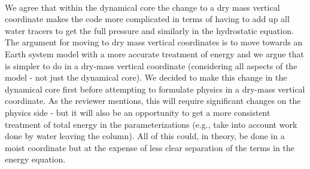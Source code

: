 \documentclass[11pt]{article}
\begin{document}
{\color{blue}{
While interesting from a design standpoint, I am not convinced that the change from moist-mass to a dry-mass vertical coordinate represents an improvement to the model, despite the great effort that would be required for this change, inside and outside of the core. The main justification given is that it makes a number of parts of the model ``easier'', although it is not clear that this is the case. While it may eliminate the need to rescale tracer masses, now the mass effect of water vapor and the condensates needs to be explicitly added in when computing the pressure-gradient force, among other considerations. It is also mentioned in Section 4.2 that many parts of the physics would need to be re-written to work with dry mass; most notably, the use of dry mass leads to the inequality of the hydrostatic assumption in (47), which is a very common assumption in models (presumably more common than the assumption that pressure surfaces do not change). }}\\

We agree that within the dynamical core the change to a dry mass vertical coordinate makes the code more complicated in terms of having to add up all water tracers to get the full pressure and similarly in the hydrostatic equation. The argument for moving to dry mass vertical coordinates  is to move towards an Earth system model with a more accurate treatment of energy and we argue that is simpler to do in a dry-mass vertical coordinate (considering all aspects of the model - not just the dynamical core). We decided to make this change in the dynamical core first before attempting to formulate physics in a dry-mass vertical coordinate. As the reviewer mentions, this will require significant changes on the physics side - but it will also be an opportunity to get a more consistent treatment of total energy in the parameterizations (e.g., take into account work done by water leaving the column). All of this could, in theory, be done in a moist coordinate but at the expense of less clear separation of the terms in the energy equation.\\ 
\end{document}

